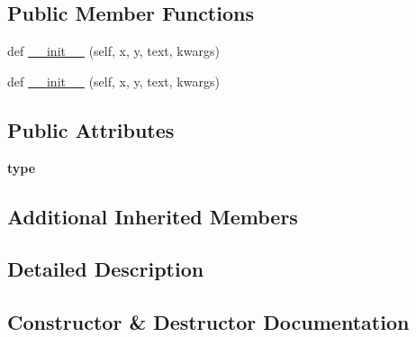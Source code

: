 \subsection*{Public Member Functions}
\begin{DoxyCompactItemize}
\item 
def \hyperlink{classremi_1_1gui_1_1SvgText_ae9758ce30dc750f604f1838ec45ad310}{\+\_\+\+\_\+init\+\_\+\+\_\+} (self, x, y, text, kwargs)
\item 
def \hyperlink{classremi_1_1gui_1_1SvgText_ae9758ce30dc750f604f1838ec45ad310}{\+\_\+\+\_\+init\+\_\+\+\_\+} (self, x, y, text, kwargs)
\end{DoxyCompactItemize}
\subsection*{Public Attributes}
\begin{DoxyCompactItemize}
\item 
{\bfseries type}\hypertarget{classremi_1_1gui_1_1SvgText_aef13cd75ac56dfb20e11d0b5a95370e6}{}\label{classremi_1_1gui_1_1SvgText_aef13cd75ac56dfb20e11d0b5a95370e6}

\end{DoxyCompactItemize}
\subsection*{Additional Inherited Members}


\subsection{Detailed Description}
\begin{DoxyVerb}\end{DoxyVerb}
 

\subsection{Constructor \& Destructor Documentation}
